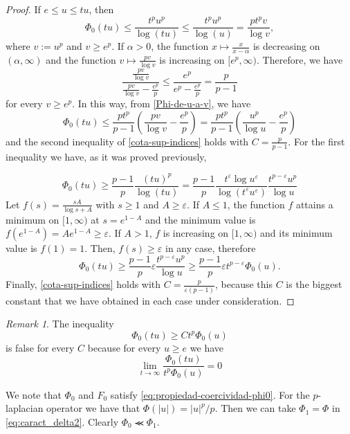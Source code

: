\documentclass[twoside]{article}
\theoremstyle{remark}
\newtheorem{comentario}{Remark}
\renewcommand{\leq}{\leqslant}
\renewcommand{\geq}{\geqslant}
\begin{document}
\begin{proof}
If $e\leq u\leq tu$, then
\begin{equation}\label{Phi-de-u-a-v}
\Phi_0(tu)\leq \frac{t^pu^p}{\log(tu)}\leq \frac{t^pu^p}{\log(u)}=\frac{pt^pv}{\log v},
\end{equation} 
where $v:=u^p$ and $v\geq e^p$.  
If $\alpha>0$, the function $x\mapsto \frac{x}{x-\alpha}$ is decreasing on $(\alpha,\infty)$
and the function $v\mapsto \frac{pv}{\log v}$ is increasing  on $[e^p,\infty)$.
Therefore,  we have
\[
\frac{\frac{pv}{\log v}}{\frac{pv}{\log v}-\frac{e^p}{p}}\leq
\frac{e^p}{e^p-\frac{e^p}{p}}=\frac{p}{p-1}
\]
for every $v \geq e^p$. In this way, from \eqref{Phi-de-u-a-v}, we have
\[
\Phi_0(tu)\leq \frac{pt^p}{p-1}\left(\frac{pv}{\log v}-\frac{e^p}{p}\right)=
 \frac{pt^p}{p-1}\left(\frac{u^p}{\log u}-\frac{e^p}{p}\right)
\]
and the second inequality of  \eqref{cota-sup-indices} holds with $C=\frac{p}{p-1}$. For the first inequality we have, as it was proved previously,

\[
  \Phi_0(tu)
  \geq
  \frac{p-1}{p}\frac{(tu)^p}{\log(tu)}
  =
  \frac{p-1}{p}
  \frac{t^{\varepsilon} \log u^{\varepsilon}}{\log(t^{\varepsilon}u^{\varepsilon})}
  \frac{t^{p-\varepsilon}u^p}{\log u}
\]
Let $f(s)=\frac{sA}{\log s+A}$ with $s\geq 1$ and $A\geq \varepsilon$.  If $A\leq 1$,  the function $f$ attains a minimum on $[1,\infty)$ at $s=e^{1-A}$ and the minimum value is $f(e^{1-A})=Ae^{1-A}\geq \varepsilon$. If $A> 1$, $f$ is increasing  on $[1,\infty)$ and its minimum value is $f(1)=1$. Then, $f(s)\geq \varepsilon$ in any case,   therefore
\[
\Phi_0(tu)\geq \frac{p-1}{p}\varepsilon \frac{t^{p-\varepsilon}u^p}{\log u}\geq
\frac{p-1}{p}\varepsilon t^{p-\varepsilon}\Phi_0(u).
\]
Finally, \eqref{cota-sup-indices} holds with $C=\frac{p}{\varepsilon (p-1)}$, because this $C$ is the biggest constant that we have obtained in each case under consideration.
\end{proof}



\begin{comentario}
The inequality
\[
\Phi_0(tu)\geq Ct^p\Phi_0(u)
\]
is false for every $C$ because for every $u\geq e$ we have
\[
\lim\limits_{t \to \infty}\frac{\Phi_0(tu)}{t^p\Phi_0(u)}=0
\]
\end{comentario}

We note that $\Phi_0$ and $F_0$ satisfy \eqref{eq:propiedad-coercividad-phi0}. For the $p$-laplacian operator we have that $\Phi(|u|)=|u|^p/p$. Then we can take $\Phi_1=\Phi$ in \eqref{eq:caract_delta2}. Clearly $\Phi_0\llcurly\Phi_1$.
\end{document}
